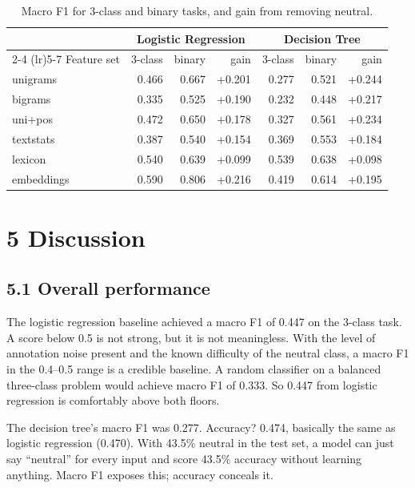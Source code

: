 \documentclass[12pt]{article}
\begin{document}
\begin{table}[h]
\centering
\caption{Macro F1 for 3-class and binary tasks, and gain from removing neutral.}
\label{tab:gain}
\small
\begin{tabular}{lrrr@{\hspace{2em}}rrr}
\toprule
& \multicolumn{3}{c}{Logistic Regression} & \multicolumn{3}{c}{Decision Tree} \\
\cmidrule(lr){2-4} \cmidrule(lr){5-7}
Feature set & 3-class & binary & gain & 3-class & binary & gain \\
\midrule
unigrams   & 0.466 & 0.667 & +0.201 & 0.277 & 0.521 & +0.244 \\
bigrams    & 0.335 & 0.525 & +0.190 & 0.232 & 0.448 & +0.217 \\
uni+pos    & 0.472 & 0.650 & +0.178 & 0.327 & 0.561 & +0.234 \\
textstats  & 0.387 & 0.540 & +0.154 & 0.369 & 0.553 & +0.184 \\
lexicon    & 0.540 & 0.639 & +0.099 & 0.539 & 0.638 & +0.098 \\
embeddings & 0.590 & 0.806 & +0.216 & 0.419 & 0.614 & +0.195 \\
\bottomrule
\end{tabular}
\end{table}



\section*{5 Discussion}



\subsection*{5.1 Overall performance}



The logistic regression baseline achieved a macro F1 of 0.447 on the 3-class task.
A score below 0.5 is not strong, but it is not meaningless.
With the level of annotation noise present and the known difficulty of the neutral class, a macro F1 in the 0.4--0.5 range is a credible baseline.
A random classifier on a balanced three-class problem would achieve macro F1 of 0.333.
So 0.447 from logistic regression is comfortably above both floors.

The decision tree's macro F1 was 0.277.
Accuracy? 0.474, basically the same as logistic regression (0.470).
With 43.5\% neutral in the test set, a model can just say ``neutral'' for every input and score 43.5\% accuracy without learning anything.
Macro F1 exposes this; accuracy conceals it.
\end{document}
